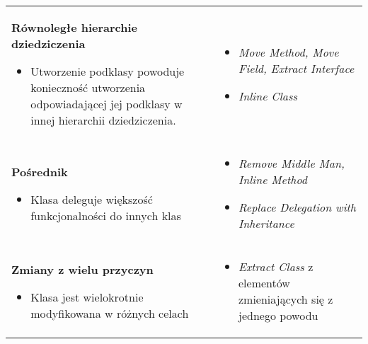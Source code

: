 \documentclass[../main.tex]{subfiles}
\begin{document}
\begin{table}[H]
\begin{center}
\begin{tabular}{ p{.35\linewidth} p{.65\linewidth}}
                \cmidrule(r){1-1}\cmidrule(l){2-2}
                \textbf{Równoległe hierarchie dziedziczenia}
                \begin{itemize}
                    \item Utworzenie podklasy powoduje konieczność utworzenia odpowiadającej jej podklasy
                    w innej hierarchii dziedziczenia.
                \end{itemize}
                &
                \begin{itemize}
                    \item \textit{Move Method, Move Field, Extract Interface}
                    \item \textit{Inline Class}
                \end{itemize}
                \\

                \cmidrule(r){1-1}\cmidrule(l){2-2}
                \textbf{Pośrednik}
                \begin{itemize}
                    \item Klasa deleguje większość funkcjonalności do innych klas
                \end{itemize}
                &
                \begin{itemize}
                    \item \textit{Remove Middle Man, Inline Method}
                    \item \textit{Replace Delegation with Inheritance}
                \end{itemize}
                \\

                \cmidrule(r){1-1}\cmidrule(l){2-2}
                \textbf{Zmiany z wielu przyczyn}
                \begin{itemize}
                    \item Klasa jest wielokrotnie modyfikowana w różnych celach
                \end{itemize}
                &
                \begin{itemize}
                    \item \textit{Extract Class} z elementów zmieniających się z jednego powodu
                \end{itemize}
                \\



\end{tabular}
\end{center}
\end{table}
\end{document}

